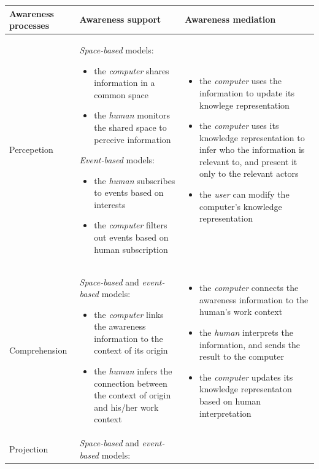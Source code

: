 {\footnotesize
\begin{longtable}{>{\raggedright}p{1.1in}>{\raggedright}p{2.2in}>{\raggedright}p{2.2in}}
\toprule 
\textbf{Awareness processes} & \textbf{Awareness support} & \textbf{Awareness mediation}\tabularnewline
\midrule 
Percepetion & \emph{Space-based} models: 
\begin{itemize}[nosep]
\item the \emph{computer} shares information in a common space
\item the \emph{human} monitors the shared space to perceive information
\end{itemize}
\emph{Event-based} models: 
\begin{itemize}[nosep]
\item the \emph{human} subscribes to events based on interests
\item the \emph{computer} filters out events based on human subscription \end{itemize}
 & \begin{itemize}[nosep]
\item the \emph{computer} uses the information to update its knowlege representation
\item the \emph{computer} uses its knowledge representation to infer who
the information is relevant to, and present it only to the relevant
actors
\item the \emph{user} can modify the computer's knowledge representation \end{itemize}
\tabularnewline
\midrule 
Comprehension & \emph{Space-based} and \emph{event-based} models:
\begin{itemize}[nosep]
\item the \emph{computer} links the awareness information to the context
of its origin
\item the \emph{human} infers the connection between the context of origin
and his/her work context\end{itemize}
 & \begin{itemize}[nosep]
\item the \emph{computer} connects the awareness information to the human's
work context 
\item the \emph{human} interprets the information, and sends the result
to the computer
\item the \emph{computer} updates its knowledge representaton based on human
interpretation\end{itemize}
\tabularnewline
\midrule 
Projection & \emph{Space-based} and \emph{event-based} models:

\end{longtable}}
